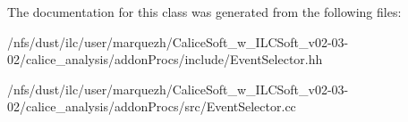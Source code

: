 The documentation for this class was generated from the following files\-:\begin{DoxyCompactItemize}
\item 
/nfs/dust/ilc/user/marquezh/\-Calice\-Soft\-\_\-w\-\_\-\-I\-L\-C\-Soft\-\_\-v02-\/03-\/02/calice\-\_\-analysis/addon\-Procs/include/Event\-Selector.\-hh\item 
/nfs/dust/ilc/user/marquezh/\-Calice\-Soft\-\_\-w\-\_\-\-I\-L\-C\-Soft\-\_\-v02-\/03-\/02/calice\-\_\-analysis/addon\-Procs/src/Event\-Selector.\-cc\end{DoxyCompactItemize}
